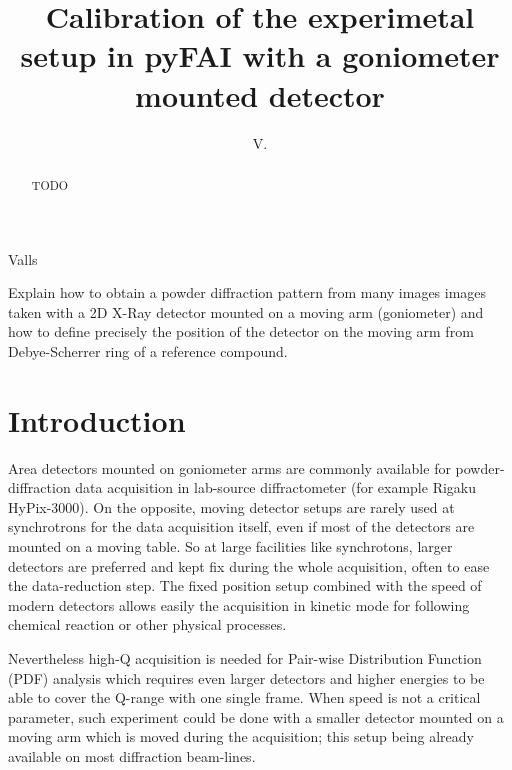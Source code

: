 \documentclass[preprint]{iucr}              %
\begin{document}

\title{Calibration of the experimetal setup in pyFAI with a goniometer
mounted detector}

 \author[a]{V.}{Valls}
 
 





\maketitle                        %

\begin{synopsis}
Explain how to obtain a powder diffraction pattern from
many images images taken with a 2D X-Ray detector mounted on a moving arm
(goniometer) and how to define precisely the position of the detector on the
moving arm from Debye-Scherrer ring of a reference compound.
\end{synopsis}

\begin{abstract}
TODO
\end{abstract}


\section{Introduction}

Area detectors mounted on goniometer arms are commonly available for
powder-diffraction data acquisition in lab-source diffractometer (for example
Rigaku HyPix-3000).
On the opposite, moving detector setups are rarely used at synchrotrons for
the data acquisition itself, even if most of the detectors are mounted on a
moving table.
So at large facilities like synchrotons, larger detectors are 
preferred and kept fix during the whole acquisition, often to ease the
data-reduction step.
The fixed position setup combined with the speed of modern detectors allows
easily the acquisition in kinetic mode for following chemical reaction or other
physical processes.

Nevertheless high-Q acquisition is needed for Pair-wise Distribution Function
(PDF) analysis which requires even larger detectors and higher energies to be
able to cover the Q-range with one single frame.
When speed is not a critical parameter, such experiment could be done with a
smaller detector mounted on a moving arm which is moved during the
acquisition; this setup being already available on most diffraction beam-lines.
\end{document}
